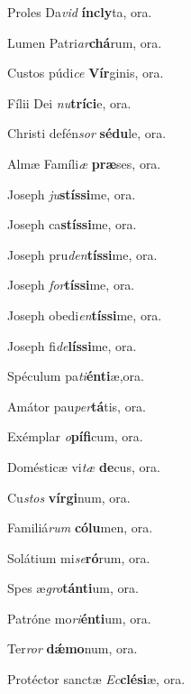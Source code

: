 \noindent Proles Da\tinyhspace\textit{vid} \textbf{íncly}ta, \hfill ora.

\noindent Lumen Patri\tinyhspace\textit{ar}\textbf{chá}rum, \hfill ora.

\noindent
Custos púdi\tinyhspace\textit{ce} \textbf{Vír}ginis, \hfill ora.

\noindent
Fílii Dei \textit{nu}\textbf{tríci}e, \hfill ora.

\noindent
Christi defén\spurhspace\textit{sor} \textbf{sédu}le, \hfill ora.

\noindent
Almæ Famíli\tinyhspace\textit{æ} \textbf{præ}ses, \hfill ora.

\noindent
Joseph \textit{ju}\textbf{stíssi}me, \hfill ora.

\noindent
Joseph ca\tinyhspace\textbf{stíssi}me, \hfill ora.

\noindent
Joseph pru\textit{den}\textbf{tíssi}me, \hfill ora.

\noindent
Joseph \textit{for}\textbf{tíssi}me, \hfill ora.

\noindent
Joseph obedi\tinyhspace\textit{en}\textbf{tíssi}me, \hfill ora.

\noindent
Joseph fi\tinyhspace\textit{de}\textbf{líssi}me, \hfill ora.

\noindent
Spéculum pa\tinyhspace\textit{ti}\textbf{énti}æ,\hfill ora.

\noindent
Amátor pau\textit{per}\textbf{tá}tis, \hfill ora.

\noindent
Exémplar \textit{o}\textbf{pífi}cum, \hfill ora.

\noindent
Domésticæ vi\tinyhspace\textit{tæ} \textbf{de}cus, \hfill ora.

\noindent
Cu\spurhspace\textit{stos} \textbf{vírgi}num, \hfill ora.

\noindent
Familiá\tinyhspace\textit{rum} \textbf{cólu}men, \hfill ora.

\noindent
Solátium mi\tinyhspace\textit{se}\textbf{ró}rum, \hfill ora.

\noindent
Spes æ\tinyhspace\textit{gro}\textbf{tánti}um, \hfill ora.

\noindent
Patróne mo\textit{ri}\textbf{énti}um, \hfill ora.

\noindent
Ter\textit{ror} \textbf{dǽmo}num, \hfill ora.

\noindent
Protéctor sanctæ \textit{Ec}\textbf{clési}æ, \hfill ora.